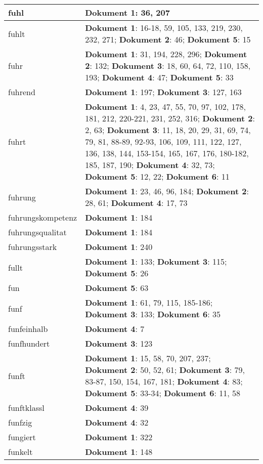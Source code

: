 \documentclass[a5paper]{article}
\begin{document}
\begin{longtable}[l]{|l|p{3in}|}
\hline
fuhl & \textbf{Dokument 1}: 36, 207 \\
\hline
fuhlt & \textbf{Dokument 1}: 16-18, 59, 105, 133, 219, 230, 232, 271; \textbf{Dokument 2}: 46; \textbf{Dokument 5}: 15 \\
\hline
fuhr & \textbf{Dokument 1}: 31, 194, 228, 296; \textbf{Dokument 2}: 132; \textbf{Dokument 3}: 18, 60, 64, 72, 110, 158, 193; \textbf{Dokument 4}: 47; \textbf{Dokument 5}: 33 \\
\hline
fuhrend & \textbf{Dokument 1}: 197; \textbf{Dokument 3}: 127, 163 \\
\hline
fuhrt & \textbf{Dokument 1}: 4, 23, 47, 55, 70, 97, 102, 178, 181, 212, 220-221, 231, 252, 316; \textbf{Dokument 2}: 2, 63; \textbf{Dokument 3}: 11, 18, 20, 29, 31, 69, 74, 79, 81, 88-89, 92-93, 106, 109, 111, 122, 127, 136, 138, 144, 153-154, 165, 167, 176, 180-182, 185, 187, 190; \textbf{Dokument 4}: 32, 73; \textbf{Dokument 5}: 12, 22; \textbf{Dokument 6}: 11 \\
\hline
fuhrung & \textbf{Dokument 1}: 23, 46, 96, 184; \textbf{Dokument 2}: 28, 61; \textbf{Dokument 4}: 17, 73 \\
\hline
fuhrungskompetenz & \textbf{Dokument 1}: 184 \\
\hline
fuhrungsqualitat & \textbf{Dokument 1}: 184 \\
\hline
fuhrungsstark & \textbf{Dokument 1}: 240 \\
\hline
fullt & \textbf{Dokument 1}: 133; \textbf{Dokument 3}: 115; \textbf{Dokument 5}: 26 \\
\hline
fun & \textbf{Dokument 5}: 63 \\
\hline
funf & \textbf{Dokument 1}: 61, 79, 115, 185-186; \textbf{Dokument 3}: 133; \textbf{Dokument 6}: 35 \\
\hline
funfeinhalb & \textbf{Dokument 4}: 7 \\
\hline
funfhundert & \textbf{Dokument 3}: 123 \\
\hline
funft & \textbf{Dokument 1}: 15, 58, 70, 207, 237; \textbf{Dokument 2}: 50, 52, 61; \textbf{Dokument 3}: 79, 83-87, 150, 154, 167, 181; \textbf{Dokument 4}: 83; \textbf{Dokument 5}: 33-34; \textbf{Dokument 6}: 11, 58 \\
\hline
funftklassl & \textbf{Dokument 4}: 39 \\
\hline
funfzig & \textbf{Dokument 4}: 32 \\
\hline
fungiert & \textbf{Dokument 1}: 322 \\
\hline
funkelt & \textbf{Dokument 1}: 148 \\
\hline

\end{longtable}
\end{document}

